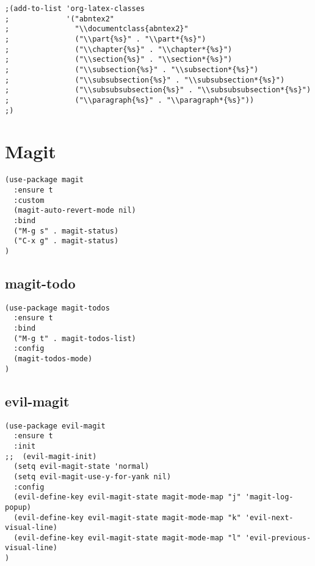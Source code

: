 \documentclass[11pt]{article}
\begin{document}
\begin{verbatim}
;(add-to-list 'org-latex-classes
;             '("abntex2"
;               "\\documentclass{abntex2}"
;               ("\\part{%s}" . "\\part*{%s}")
;               ("\\chapter{%s}" . "\\chapter*{%s}")
;               ("\\section{%s}" . "\\section*{%s}")
;               ("\\subsection{%s}" . "\\subsection*{%s}")
;               ("\\subsubsection{%s}" . "\\subsubsection*{%s}")
;               ("\\subsubsubsection{%s}" . "\\subsubsubsection*{%s}")
;               ("\\paragraph{%s}" . "\\paragraph*{%s}"))
;)
\end{verbatim}


\section*{Magit}
\label{sec:orgdd6f9b6}

\begin{verbatim}
(use-package magit
  :ensure t
  :custom
  (magit-auto-revert-mode nil)
  :bind
  ("M-g s" . magit-status)
  ("C-x g" . magit-status)
)
\end{verbatim}

\subsection*{magit-todo}
\label{sec:orgac4c222}

\begin{verbatim}
(use-package magit-todos
  :ensure t
  :bind
  ("M-g t" . magit-todos-list)
  :config
  (magit-todos-mode)
)
\end{verbatim}

\subsection*{evil-magit}
\label{sec:orgd364aa3}
\begin{verbatim}
(use-package evil-magit
  :ensure t
  :init
;;  (evil-magit-init)
  (setq evil-magit-state 'normal)
  (setq evil-magit-use-y-for-yank nil)
  :config
  (evil-define-key evil-magit-state magit-mode-map "j" 'magit-log-popup)
  (evil-define-key evil-magit-state magit-mode-map "k" 'evil-next-visual-line)
  (evil-define-key evil-magit-state magit-mode-map "l" 'evil-previous-visual-line)
)
\end{verbatim}
\end{document}
